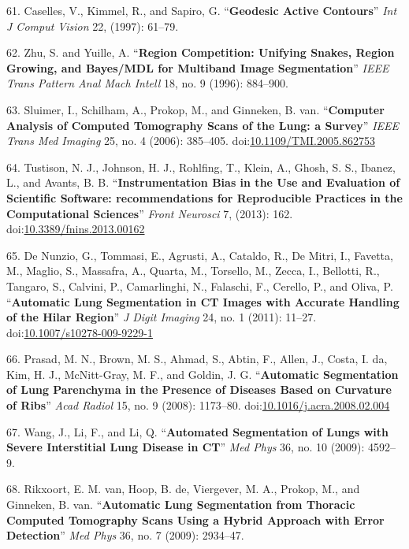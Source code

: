\documentclass[11pt,]{article}
\begin{document}
61. Caselles, V., Kimmel, R., and Sapiro, G. ``\textbf{Geodesic Active
Contours}'' \emph{Int J Comput Vision} 22, (1997): 61--79.

62. Zhu, S. and Yuille, A. ``\textbf{Region Competition: Unifying
Snakes, Region Growing, and Bayes/MDL for Multiband Image
Segmentation}'' \emph{IEEE Trans Pattern Anal Mach Intell} 18, no. 9
(1996): 884--900.

63. Sluimer, I., Schilham, A., Prokop, M., and Ginneken, B. van.
``\textbf{Computer Analysis of Computed Tomography Scans of the Lung: a
Survey}'' \emph{IEEE Trans Med Imaging} 25, no. 4 (2006): 385--405.
doi:\href{http://dx.doi.org/10.1109/TMI.2005.862753}{10.1109/TMI.2005.862753}

64. Tustison, N. J., Johnson, H. J., Rohlfing, T., Klein, A., Ghosh, S.
S., Ibanez, L., and Avants, B. B. ``\textbf{Instrumentation Bias in the
Use and Evaluation of Scientific Software: recommendations for
Reproducible Practices in the Computational Sciences}'' \emph{Front
Neurosci} 7, (2013): 162.
doi:\href{http://dx.doi.org/10.3389/fnins.2013.00162}{10.3389/fnins.2013.00162}

65. De Nunzio, G., Tommasi, E., Agrusti, A., Cataldo, R., De Mitri, I.,
Favetta, M., Maglio, S., Massafra, A., Quarta, M., Torsello, M., Zecca,
I., Bellotti, R., Tangaro, S., Calvini, P., Camarlinghi, N., Falaschi,
F., Cerello, P., and Oliva, P. ``\textbf{Automatic Lung Segmentation in
CT Images with Accurate Handling of the Hilar Region}'' \emph{J Digit
Imaging} 24, no. 1 (2011): 11--27.
doi:\href{http://dx.doi.org/10.1007/s10278-009-9229-1}{10.1007/s10278-009-9229-1}

66. Prasad, M. N., Brown, M. S., Ahmad, S., Abtin, F., Allen, J., Costa,
I. da, Kim, H. J., McNitt-Gray, M. F., and Goldin, J. G.
``\textbf{Automatic Segmentation of Lung Parenchyma in the Presence of
Diseases Based on Curvature of Ribs}'' \emph{Acad Radiol} 15, no. 9
(2008): 1173--80.
doi:\href{http://dx.doi.org/10.1016/j.acra.2008.02.004}{10.1016/j.acra.2008.02.004}

67. Wang, J., Li, F., and Li, Q. ``\textbf{Automated Segmentation of
Lungs with Severe Interstitial Lung Disease in CT}'' \emph{Med Phys} 36,
no. 10 (2009): 4592--9.

68. Rikxoort, E. M. van, Hoop, B. de, Viergever, M. A., Prokop, M., and
Ginneken, B. van. ``\textbf{Automatic Lung Segmentation from Thoracic
Computed Tomography Scans Using a Hybrid Approach with Error
Detection}'' \emph{Med Phys} 36, no. 7 (2009): 2934--47.
\end{document}
